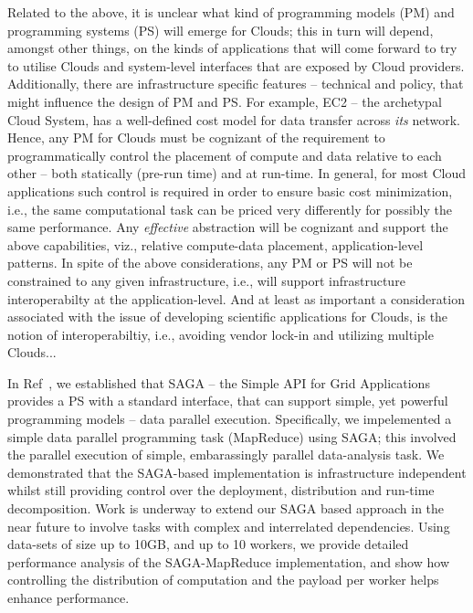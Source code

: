 \documentclass[conference,final]{IEEEtran}
\begin{document}
Related to the above, it is unclear what kind of programming models
(PM) and programming systems (PS) will emerge for Clouds; this in turn
will depend, amongst other things, on the kinds of applications that
will come forward to try to utilise Clouds and system-level interfaces
that are exposed by Cloud providers.  Additionally, there are
infrastructure specific features -- technical and policy, that might
influence the design of PM and PS. For example, EC2 -- the archetypal
Cloud System, has a well-defined cost model for data transfer across
{\it its} network. Hence, any PM for Clouds must be cognizant of the
requirement to programmatically control the placement of compute and
data relative to each other -- both statically (pre-run time) and at
run-time.
In general, for most Cloud applications such control is required in
order to ensure basic cost minimization, i.e., the same computational
task can be priced very differently for possibly the same performance.
Any {\it effective} abstraction will be cognizant and support the
above capabilities, viz., relative compute-data placement,
application-level patterns. 
In spite of the above considerations, any PM or PS will not be
constrained to any given infrastructure, i.e., will support
infrastructure interoperabilty at the application-level.  And at least
as important a consideration associated with the issue of developing
scientific applications for Clouds, is the notion of interoperabiltiy,
i.e., avoiding vendor lock-in and utilizing multiple Clouds...

In Ref~\cite{saga_ccgrid09}, we established  that
SAGA -- the Simple API for Grid Applications provides 
a PS with a standard interface, %
that can support simple, yet powerful programming models -- data
parallel execution.  Specifically, we impelemented a simple data
parallel programming task (MapReduce) using SAGA; this involved the
parallel execution of simple, embarassingly parallel data-analysis
task.  We demonstrated that the SAGA-based implementation is
infrastructure independent whilst still providing control over the
deployment, distribution and run-time decomposition.  Work is underway
to extend our SAGA based approach in the near future to involve tasks
with complex and interrelated dependencies.  Using data-sets of size
up to 10GB, and up to 10 workers, we provide detailed performance
analysis of the SAGA-MapReduce implementation, and show how
controlling the distribution of computation and the payload per worker
helps enhance performance.
\end{document}
